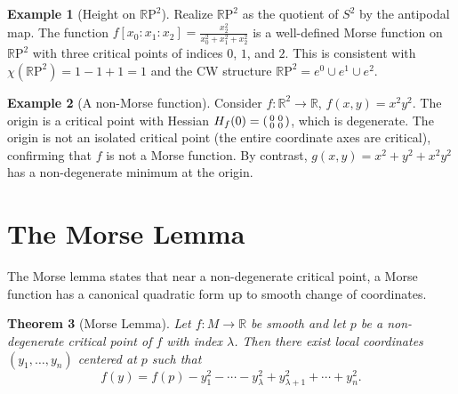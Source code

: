 \documentclass[12pt,a4paper,openany]{book}
\newtheorem{theorem}{Theorem}[section]
\theoremstyle{definition}
\newtheorem{example}[theorem]{Example}
\theoremstyle{remark}
\newcommand{\R}{\mathbb{R}}
\newcommand{\RP}{\mathbb{R}\mathrm{P}}
\begin{document}
\begin{example}[Height on $\RP^2$]\label{ex:height-rp2}
Realize $\RP^2$ as the quotient of $S^2$ by the antipodal map.
The function $f[x_0:x_1:x_2] = \frac{x_2^2}{x_0^2+x_1^2+x_2^2}$
is a well-defined Morse function on $\RP^2$ with three critical points
of indices $0$, $1$, and $2$. This is consistent with
$\chi(\RP^2) = 1 - 1 + 1 = 1$ and the CW structure
$\RP^2 = e^0 \cup e^1 \cup e^2$.
\end{example}

\begin{example}[A non-Morse function]\label{ex:non-morse}
Consider $f\colon \R^2 \to \R$, $f(x,y) = x^2 y^2$. The origin
is a critical point with Hessian
$H_f(0) = \begin{psmallmatrix} 0 & 0 \\ 0 & 0 \end{psmallmatrix}$,
which is degenerate. The origin is not an isolated critical point
(the entire coordinate axes are critical), confirming that $f$
is not a Morse function. By contrast, $g(x,y) = x^2 + y^2 + x^2y^2$
has a non-degenerate minimum at the origin.
\end{example}

\section{The Morse Lemma}\label{sec:morse-lemma}

The Morse lemma states that near a non-degenerate critical point,
a Morse function has a canonical quadratic form up to smooth
change of coordinates.

\begin{theorem}[Morse Lemma]\label{thm:morse-lemma}
Let $f\colon M \to \R$ be smooth and let $p$ be a non-degenerate
critical point of $f$ with index $\lambda$. Then there exist local
coordinates $(y_1,\dots,y_n)$ centered at $p$ such that
\[
  f(y) = f(p) - y_1^2 - \cdots - y_\lambda^2 + y_{\lambda+1}^2 + \cdots + y_n^2.
\]
\end{theorem}
\end{document}
